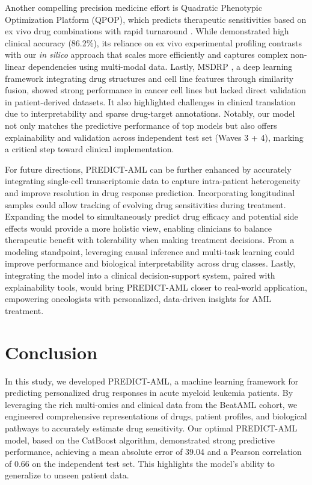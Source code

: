 \documentclass[pdflatex,sn-mathphys-num]{sn-jnl}%
\theoremstyle{thmstyleone}%
\theoremstyle{thmstyletwo}%
\theoremstyle{thmstylethree}%
\begin{document}
Another compelling precision medicine effort is Quadratic Phenotypic Optimization Platform (QPOP), which predicts therapeutic sensitivities based on ex vivo drug combinations with rapid turnaround \cite{sahib2024combinatorial}. While \cite{sahib2024combinatorial} demonstrated high clinical accuracy (86.2\%), its reliance on ex vivo experimental profiling contrasts with our \textit{in silico} approach that scales more efficiently and captures complex non-linear dependencies using multi-modal data. 
Lastly, MSDRP \cite{zhao2023msdrp}, a deep learning framework integrating drug structures and cell line features through similarity fusion, showed strong performance in cancer cell lines but lacked direct validation in patient-derived datasets. It also highlighted challenges in clinical translation due to interpretability and sparse drug-target annotations. Notably, our model not only matches the predictive performance of top models but also offers explainability and validation across independent test set (Waves 3 + 4), marking a critical step toward clinical implementation.

For future directions, PREDICT-AML can be further enhanced by accurately integrating single-cell transcriptomic data to capture intra-patient heterogeneity and improve resolution in drug response prediction. Incorporating longitudinal samples could allow tracking of evolving drug sensitivities during treatment. Expanding the model to simultaneously predict drug efficacy and potential side effects would provide a more holistic view, enabling clinicians to balance therapeutic benefit with tolerability when making treatment decisions. From a modeling standpoint, leveraging causal inference and multi-task learning could improve performance and biological interpretability across drug classes. Lastly, integrating the model into a clinical decision-support system, paired with explainability tools, would bring PREDICT-AML closer to real-world application, empowering oncologists with personalized, data-driven insights for AML treatment.


\section{Conclusion}\label{sec5}
In this study, we developed PREDICT-AML, a machine learning framework for predicting personalized drug responses in acute myeloid leukemia patients. By leveraging the rich multi-omics and clinical data from the BeatAML cohort, we engineered comprehensive representations of drugs, patient profiles, and biological pathways to accurately estimate drug sensitivity.
Our optimal PREDICT-AML model, based on the CatBoost algorithm, demonstrated strong predictive performance, achieving a mean absolute error of 39.04 and a Pearson correlation of 0.66 on the independent test set. This highlights the model's ability to generalize to unseen patient data.
\end{document}
